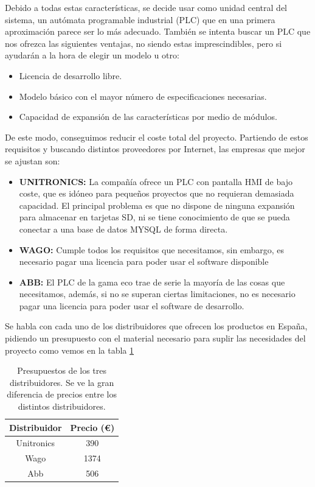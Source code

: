 Debido a todas estas características, se decide usar como unidad central del sistema, un autómata programable industrial (PLC) que en una primera aproximación parece ser lo más adecuado. También se intenta buscar un PLC que nos ofrezca las siguientes ventajas, no siendo estas imprescindibles, pero si ayudarán a la hora de elegir un modelo u otro:

\begin{itemize}
		\item{Licencia de desarrollo libre.}
		\item{Modelo básico con el mayor número de especificaciones necesarias.}
		\item{Capacidad de expansión de las características por medio de módulos.}
\end{itemize}

De este modo, conseguimos reducir el coste total del proyecto. Partiendo de estos requisitos y buscando distintos proveedores por Internet, las empresas que mejor se ajustan son:

\begin{itemize}
		\item{\textbf{UNITRONICS:} La compañía ofrece un PLC con pantalla HMI de bajo coste, que es idóneo para pequeños proyectos que no requieran demasiada capacidad. El principal problema es que no dispone de ninguna expansión para almacenar en tarjetas SD, ni se tiene conocimiento de que se pueda conectar a una base de datos MYSQL de forma directa.}
		\item{\textbf{WAGO:} Cumple todos los requisitos que necesitamos, sin embargo, es necesario pagar una licencia para poder usar el software disponible}
		\item{\textbf{ABB:} El PLC de la gama eco trae de serie la mayoría de las cosas que necesitamos, además, si no se superan ciertas limitaciones, no es necesario pagar una licencia para poder usar el software de desarrollo.}
\end{itemize}

Se habla con cada uno de los distribuidores que ofrecen los productos en España, pidiendo un presupuesto con el material necesario para suplir las necesidades del proyecto como vemos en la tabla \ref{tab:presupuestos}

\begin{table}[H]
	\centering
	\begin{tabular}{cc}
		{\bf Distribuidor} & {\bf Precio (\euro{})} \\ \hline
		Unitronics         & 390              \\
		Wago               & 1374             \\
		Abb                & 506              \\
	\end{tabular}
	\caption[Presupuesto de los tres distribuidores]{Presupuestos de los tres distribuidores. Se ve la gran diferencia de precios entre los distintos distribuidores.}
	\label{tab:presupuestos}
\end{table}

